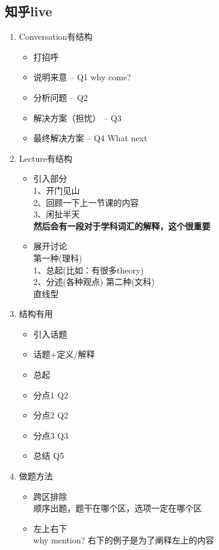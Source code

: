 \documentclass[UTF8]{ctexart}
\begin{document}
\subsection{知乎live}
\begin{enumerate}
  \item Conversation有结构
  \begin{itemize}
    \item 打招呼
    \item 说明来意 -- Q1 why come?
    \item 分析问题 -- Q2
    \item 解决方案（担忧） -- Q3
    \item 最终解决方案 -- Q4 What next
  \end{itemize}
  \item Lecture有结构
  \begin{itemize}
    \item 引入部分\\
    1、开门见山\\
    2、回顾一下上一节课的内容\\
    3、闲扯半天\\
    \textbf{然后会有一段对于学科词汇的解释，这个很重要}
    \item 展开讨论\\
    第一种(理科)\\
    1、总起(比如：有很多theory)\\
    2、分述(各种观点)
    第二种(文科)\\
    直线型\\
  \end{itemize}
  \item 结构有用
  \begin{itemize}
    \item 引入话题
    \item 话题+定义/解释
    \item 总起
    \item 分点1 Q2
    \item 分点2 Q2
    \item 分点3 Q3
    \item 总结     Q5
  \end{itemize}
  \item 做题方法
  \begin{itemize}
    \item 跨区排除\\
    顺序出题，题干在哪个区，选项一定在哪个区
    \item 左上右下\\
    why mention? 右下的例子是为了阐释左上的内容
  \end{itemize}
\end{enumerate}
\end{document}
